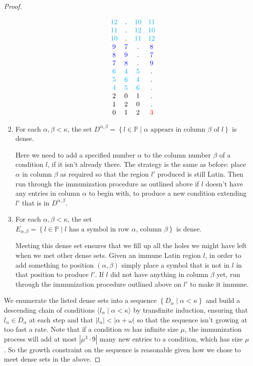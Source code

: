 \documentclass[12pt,a4paper]{article}
\newcommand{\st}{\; | \;}
\newcommand{\set}[2]{\left\{#1\st #2 \right\}}
\newcommand{\seq}[2]{\langle #1 \st #2 \rangle}
\renewcommand{\P}{\mathbb{P}}
\begin{document}
\begin{proof}
\begin{enumerate}
$$\begin{array}{cccc}
						\color{cyan}12&.&\color{cyan}10&\color{cyan}11\\
						\color{cyan}11&.&\color{cyan}12&\color{cyan}10\\
						\color{cyan}10&.&\color{cyan}11&\color{cyan}12\\
						\color{blue}9&\color{blue}7&.&\color{blue}8\\
						\color{blue}8&\color{blue}9&.&\color{blue}7\\
						\color{blue}7&\color{blue}8&.&\color{blue}9\\
						\color{cyan}6&\color{cyan}4&\color{cyan}5&.\\
						\color{cyan}5&\color{cyan}6&\color{cyan}4&.\\
						\color{cyan}4&\color{cyan}5&\color{cyan}6&.\\
						2  & 0   &  1 &. \\ 
						1 & 2 &  0 & . \\
						0  & 1 & 2 & {\textcolor{red} 3}
		\end{array}$$
	
		\item For each $\alpha, \beta<\kappa$, the set $D^{\alpha, \beta}=\set{l\in \P}{\alpha \text{ appears in column } \beta \text{ of } l}$ is dense. 
		
		Here we need to add a specified number $\alpha$ to the column number $\beta$ of a condition $l$, if it isn't already there. The strategy is the same as before: place $\alpha$ in column $\beta$ as required so that the region $l'$ produced is still Latin. Then run through the immunization procedure as outlined above if $l$ doesn't have any entries in column $\alpha$ to begin with, to produce a new condition extending $l'$ that is in $D^{\alpha, \beta}$.
		
		\item For each $\alpha, \beta < \kappa$, the set $E_{\alpha, \beta}=\set{l \in \P}{\text{$l$ has a symbol in row $\alpha$, column $\beta$}}$ is dense.
		
		Meeting this dense set ensures that we fill up all the holes we might have left when we met other dense sets. Given an immune Latin region $l$, in order to add something to position $(\alpha, \beta)$ simply place a symbol that is not in $l$ in that position to produce $l'$. If $l$ did not have anything in column $\beta$ yet, run through the immunization procedure outlined above on $l'$ to make it immune.
\end{enumerate}

We enumerate the listed dense sets into a sequence $\set{D_\alpha}{\alpha<\kappa}$ and build a descending chain of conditions $\seq{l_\alpha}{\alpha<\kappa}$ by transfinite induction, ensuring that $l_\alpha\in D_\alpha$ at each step and that $|l_\alpha|<|\alpha+\omega|$ so that the sequence isn't growing at too fast a rate. Note that if a condition $m$ has infinite size $\mu$, the immunization process will add at most $|\mu^3 \cdot 9|$ many new entries to a condition, which has size $\mu$. So the growth constraint on the sequence is reasonable given how we chose to meet dense sets in the above.


\end{proof}
\end{document}
